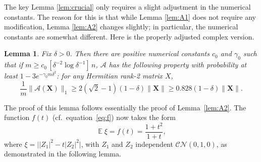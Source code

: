 \documentclass[11pt]{article}
\newtheorem{lemma}[theorem]{Lemma}
\newcommand{\<}{\langle}
\renewcommand{\>}{\rangle}
\newcommand{\E}{\operatorname{\mathbb{E}}}
\newcommand{\bX}{\bm{X}}
\numberwithin{equation}{section}
\newcommand{\cA}{\mathcal{A}}
\begin{document}
The key Lemma \ref{lem:crucial} only requires a slight adjustment in
the numerical constants. The reason for this is that while Lemma
\ref{lem:A1} does not require any modification, Lemma \ref{lem:A2}
changes slightly; in particular, the numerical constants are somewhat
different. Here is the properly adjusted complex version.
\begin{lemma}
  \label{lem:A2C}
  Fix $\delta > 0$. Then there are positive numerical constants $c_0$
  and $\gamma_0$ such that if $m \ge c_0 \, [\delta^{-2} \log
  \delta^{-1}] \, n$, $\cA$ has the following property with
  probability at least $1 - 3 e^{-\gamma_0 m\delta^2}$: for any
  Hermitian rank-2 matrix $X$,
\begin{equation}
\label{eq:A2bC}
\frac{1}{m} \|\cA(\bX)\|_1 \ge 2(\sqrt{2}-1) (1-\delta) \|\bX\| \ge
0.828(1-\delta)\|\bX\|.
\end{equation}
\end{lemma}
The proof of this lemma follows essentially the proof of
Lemma~\ref{lem:A2}. 
The function $f(t)$ (cf.\ equation~\eqref{eq:f}) 
now takes the form
\begin{equation}
\E \xi = f(t) =  \frac{1+t^2}{1+t},
\label{eq:fcomplex}
\end{equation}
where $\xi = \big| |Z_1|^2 - t |Z_2|^2\big|$, with $Z_1$ and $Z_2$
independent $\mathcal{C}\mathcal{N}(0,1,0)$, as demonstrated in the
following lemma.
\end{document}
